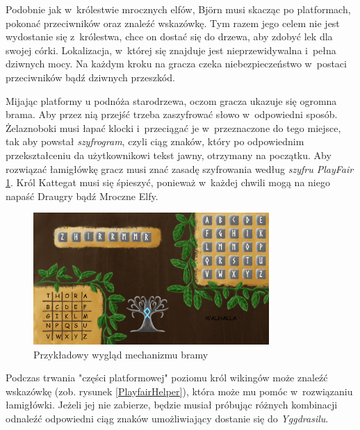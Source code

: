 \documentclass[12pt,a4paper,oneside]{book}
\theoremstyle{definition}
\numberwithin{equation}{chapter}
\begin{document}
\par Podobnie jak w~królestwie mrocznych elfów, Björn musi skacząc po platformach, pokonać przeciwników oraz znaleźć wskazówkę. Tym razem jego celem nie jest wydostanie się z~królestwa, chce on dostać się do drzewa, aby zdobyć lek dla swojej córki. Lokalizacja, w~której się znajduje jest nieprzewidywalna i~pełna dziwnych mocy. Na każdym kroku na gracza czeka niebezpieczeństwo w~postaci przeciwników bądź dziwnych przeszkód.

\par Mijając platformy u podnóża starodrzewa, oczom gracza ukazuje się ogromna brama. Aby przez nią przejść trzeba zaszyfrować słowo w~odpowiedni sposób. Żelaznoboki musi łapać klocki i~przeciągać je w~przeznaczone do tego miejsce, tak aby powstał \textit{szyfrogram}, czyli ciąg znaków, który po odpowiednim przekształceniu da użytkownikowi tekst jawny, otrzymany na początku. Aby rozwiązać łamigłówkę gracz musi znać zasadę szyfrowania według \textit{szyfru PlayFair} \ref{PlayfairMechanism}. Król Kattegat musi się śpieszyć, ponieważ w~każdej chwili mogą na niego napaść Draugry bądź Mroczne Elfy.\hfill \break

\begin{figure}[hpt!]
        \centering
        \includegraphics[width=0.8\textwidth]{poziomy/playfair.png}
        \caption{Przykładowy wygląd mechanizmu bramy}
        \label{PlayfairMechanism}
    \end{figure}
\newpage
\par Podczas trwania "części platformowej" poziomu król wikingów może znaleźć wskazówkę (zob. rysunek \ref{PlayfairHelper}), która może mu pomóc w~rozwiązaniu łamigłówki. Jeżeli jej nie zabierze, będzie musiał próbując różnych kombinacji odnaleźć 
odpowiedni ciąg znaków umożliwiający dostanie się do \textit{Yggdrasilu}.
\end{document}
